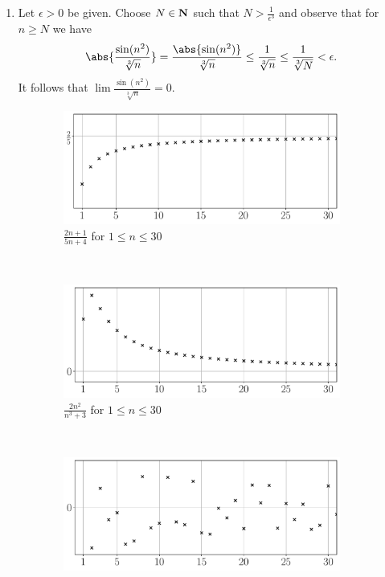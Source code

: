 \documentclass{lew98_solutions}
\begin{document}
\begin{solution}
\begin{enumerate}
        \item Let \( \epsilon > 0 \) be given. Choose \( N \in \mathbf{N} \) such that \( N > \tfrac{1}{\epsilon^3} \) and observe that for \( n \geq N \) we have
        \[
            \abs{\frac{\sin(n^2)}{\sqrt[3]{n}}} = \frac{\abs{\sin(n^2)}}{\sqrt[3]{n}} \leq \frac{1}{\sqrt[3]{n}} \leq \frac{1}{\sqrt[3]{N}} < \epsilon.
        \]
        It follows that \( \lim \tfrac{\sin(n^2)}{\sqrt[3]{n}} = 0 \).
    \end{enumerate}
    \begin{figure}
        \centering
        \begin{subfigure}{0.75\textwidth}
            \includegraphics[width=\textwidth]{UA_Figures/UA_ex2_2_2_fig_a.pdf}
            \caption{\( \tfrac{2n + 1}{5n + 4} \) for \( 1 \leq n \leq 30 \)}
        \end{subfigure} \\
        \begin{subfigure}{0.75\textwidth}
            \includegraphics[width=\textwidth]{UA_Figures/UA_ex2_2_2_fig_b.pdf}
            \caption{\( \tfrac{2n^2}{n^3 + 3} \) for \( 1 \leq n \leq 30 \)}
        \end{subfigure} \\
        \begin{subfigure}{0.75\textwidth}
            \includegraphics[width=\textwidth]{UA_Figures/UA_ex2_2_2_fig_c.pdf}

\end{subfigure}
\end{figure}
\end{solution}
\end{document}
